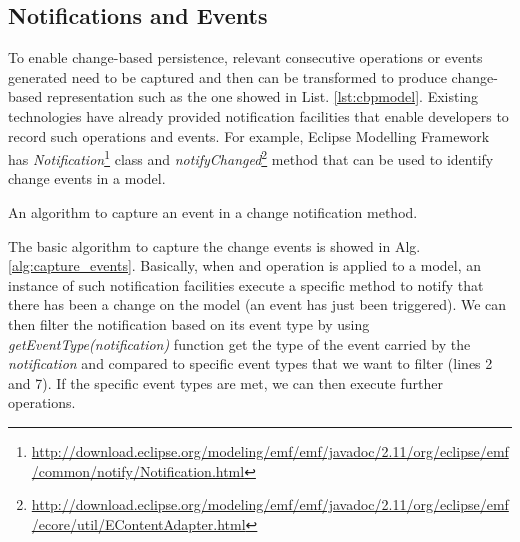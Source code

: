 \documentclass[sigconf]{acmart}
\begin{document}
\subsection{Notifications and Events}
\label{sec:notifications_and_events}
To enable change-based persistence, relevant consecutive operations or events generated need to be captured and then can be transformed to produce change-based representation such as the one showed in List. \ref{lst:cbpmodel}. Existing technologies have already provided notification facilities that enable developers to record such operations and events. For example, Eclipse Modelling Framework has \emph{Notification}\footnote{\url{http://download.eclipse.org/modeling/emf/emf/javadoc/2.11/org/eclipse/emf/common/notify/Notification.html}} class and \emph{notifyChanged}\footnote{\url{http://download.eclipse.org/modeling/emf/emf/javadoc/2.11/org/eclipse/emf/ecore/util/EContentAdapter.html}} method that can be used to identify change events in a model. 

\begin{algorithm}
\caption{An algorithm to capture an event in a change notification method.}
\label{alg:capture_events}
\end{algorithm}

The basic algorithm to capture the change events is showed in Alg. \ref{alg:capture_events}. Basically, when and operation is applied to a model, an instance of such notification facilities execute a specific method to notify that there has been a change on the model (an event has just been triggered). We can then filter the notification based on its event type by using \emph{getEventType(notification)} function get the type of the event carried by the \emph{notification} and compared to specific event types that we want to filter (lines 2 and 7). If the specific event types are met, we can then execute further operations. 
\end{document}
